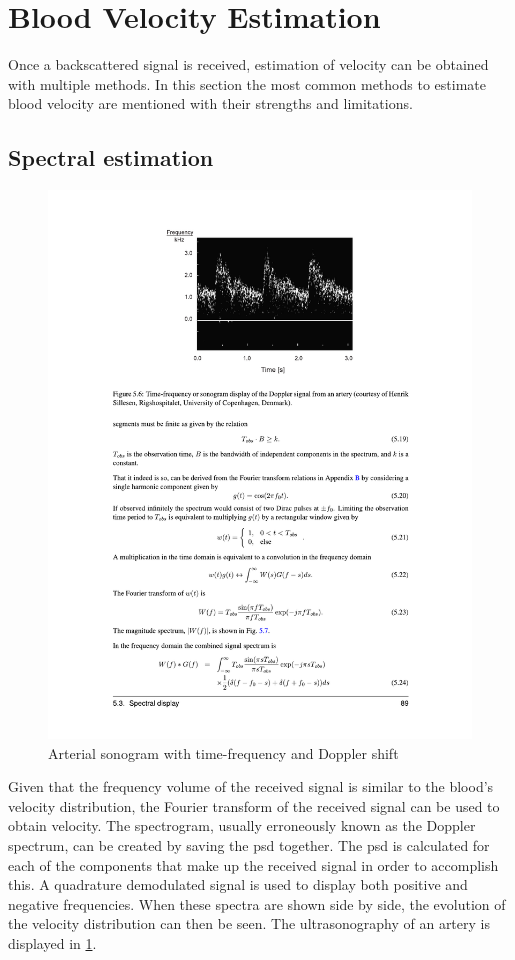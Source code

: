 \section{Blood Velocity Estimation}
Once a backscattered signal is received, estimation of velocity can be obtained with multiple methods. In this section the most common methods to estimate blood velocity are mentioned with their strengths and limitations. 
\subsection{Spectral estimation}
\begin{figure}[htbp]
	\centering
	\includegraphics[width=.8\textwidth]{Figures/2_estimation_sonogram_cph.pdf}
	\caption{Arterial sonogram with time-frequency and Doppler shift \cite{JensenUltrasoundBook}}
	\label{fig:2_estimation_sonogram_cph}
\end{figure}

Given that the frequency volume of the received signal is similar to the blood's velocity distribution, the Fourier transform of the received signal can be used to obtain velocity. The spectrogram, usually erroneously known as the Doppler spectrum, can be created by saving the \gls{psd} together. The \gls{psd} is calculated for each of the components that make up the received signal in order to accomplish this. A quadrature demodulated signal is used to display both positive and negative frequencies. When these spectra are shown side by side, the evolution of the velocity distribution can then be seen. The ultrasonography of an artery is displayed in \cref{fig:2_estimation_sonogram_cph}. 